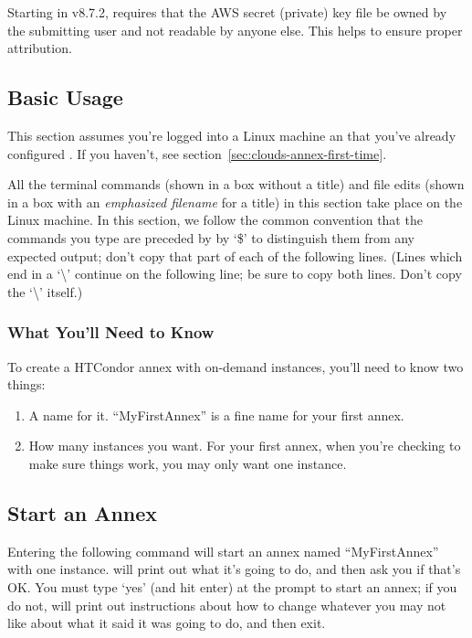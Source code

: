 Starting in v8.7.2,  requires that the AWS secret (private) key file
be owned by the submitting user and not readable by anyone else.  This
helps to ensure proper attribution.

\subsection{Basic Usage}

This section assumes you're logged into a Linux machine an that you've
already configured .  If you haven't, see
section~\ref{sec:clouds-annex-first-time}.

All the terminal commands (shown in a box without a title) and file edits
(shown in a box with an \emph{emphasized filename} for a title) in this
section take place on the Linux machine.  In this section, we follow the
common convention that the commands you type are preceded by by `\$'
to distinguish them from any expected output; don't copy that part of each
of the following lines.  (Lines which end in a `\textbackslash' continue on
the following line; be sure to copy both lines.  Don't copy the
`\textbackslash' itself.)

\subsubsection{What You'll Need to Know}

To create a HTCondor annex with on-demand instances, you'll need to know two
things:

\begin{enumerate}
\item A name for it.  ``MyFirstAnnex'' is a fine name for your first annex.
\item How many instances you want.  For your first annex, when you're checking to make sure things work, you may only want one instance.
\end{enumerate}

\subsection{Start an Annex}

Entering the following command will start an annex named ``MyFirstAnnex'' with
one instance.   will print out what it's going to do, and then
ask you if that's OK.  You must type `yes' (and hit enter) at the prompt to
start an annex; if you do not,  will print out instructions
about how to change whatever you may not like about what it said it was going
to do, and then exit.

